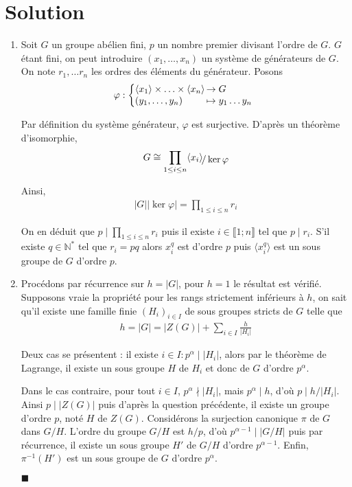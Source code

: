 \documentclass{article}
\newcommand*{\QED}{\hfill\ensuremath{\blacksquare}}%
\begin{document}
\section*{Solution}
\begin{enumerate}
\item Soit $G$ un groupe abélien fini, $p$ un nombre premier divisant l'ordre de $G$. $G$ étant fini, on peut introduire $(x_1,\ldots,x_n)$ un système de générateurs de $G$. On note $r_1,\ldots r_n$ les ordres des éléments du générateur. Posons
\begin{align*}
\varphi : \left\{
     \begin{array}{@{}l@{\thinspace}l}
     \langle x_1\rangle\times\ldots\times\langle x_n\rangle &\to G\\
     (y_1,\ldots,y_n)&\mapsto y_1\ldots y_n
     \end{array}
   \right.   
\end{align*}

Par définition du système générateur, $\varphi$ est surjective. 
D'après un théorème d'isomorphie, 
\begin{align*}
G\cong \prod_{1\leq i\leq n}\langle x_i\rangle \!\raisebox{-.50ex}{\ensuremath{/ \ker \varphi}} \end{align*}

Ainsi, 
\begin{align*}
|G||\ker \varphi| = \prod_{1\leq i\leq n}r_i 
\end{align*}

On en déduit que $p\mid \prod_{1\leq i\leq n} r_i$ puis il existe $i\in \llbracket 1;n\rrbracket$ tel que $p\mid r_i$. S'il existe $q\in \mathbb{N}^*$ tel que $r_i = pq$ alors $x_{i}^q$ est d'ordre $p$ puis $\langle x_i^q\rangle$ est un sous groupe de $G$ d'ordre $p$. 
\item Procédons par récurrence sur $h=|G|$, pour $h=1$ le résultat est vérifié. Supposons vraie la propriété pour les rangs strictement inférieurs à $h$, on sait qu'il existe une famille finie $(H_i)_{i\in I}$ de sous groupes stricts de $G$ telle que
\begin{align*}
h = |G|=|Z(G)|+\sum_{i\in I} \frac{h}{|H_i|}
\end{align*}

Deux cas se présentent : il existe $i\in I : p^{\alpha} \mid |H_i|$, alors par le théorème de Lagrange, il existe un sous groupe $H$ de $H_i$ et donc de $G$ d'ordre $p^{\alpha}$. 

Dans le cas contraire, pour tout $i\in I$, $p^{\alpha} \nmid |H_i|$, mais $p^{\alpha}\mid h$, d'où $p\mid h/|H_i|$. Ainsi $p\mid |Z(G)|$ puis d'après la question précédente, il existe un groupe d'ordre $p$, noté $H$ de $Z(G)$. Considérons la surjection canonique $\pi$ de $G$ dans $G/H$. L'ordre du groupe $G/H$ est $h/p$, d'où $p^{\alpha-1}\mid |G/H|$ puis par récurrence, il existe un sous groupe $H'$ de $G/H$ d'ordre $p^{\alpha -1}$. Enfin, $\pi^{-1}(H')$ est un sous groupe de $G$ d'ordre $p^{\alpha}$.

\QED
\end{enumerate}
\end{document}

